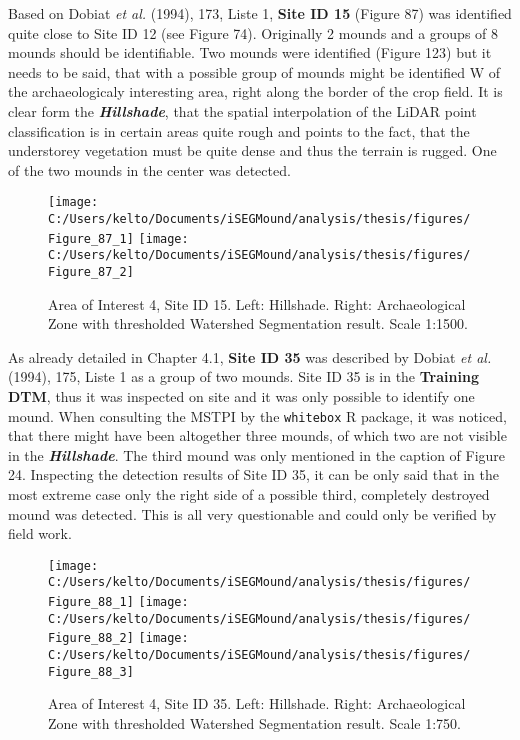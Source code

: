 \documentclass[
  12pt,
]{article}
\begin{document}
Based on Dobiat \emph{et al.} (1994), 173, Liste 1, \textbf{Site ID 15} (Figure 87) was identified quite close to Site ID 12 (see Figure 74). Originally 2 mounds and a groups of 8 mounds should be identifiable. Two mounds were identified (Figure 123) but it needs to be said, that with a possible group of mounds might be identified W of the archaeologicaly interesting area, right along the border of the crop field. It is clear form the \textbf{\emph{Hillshade}}, that the spatial interpolation of the LiDAR point classification is in certain areas quite rough and points to the fact, that the understorey vegetation must be quite dense and thus the terrain is rugged.
One of the two mounds in the center was detected.

\begin{figure}
\texttt{[image: C:/Users/kelto/Documents/iSEGMound/analysis/thesis/figures/Figure\_87\_1]} \texttt{[image: C:/Users/kelto/Documents/iSEGMound/analysis/thesis/figures/Figure\_87\_2]} \caption{Area of Interest 4, Site ID 15. Left: Hillshade. Right: Archaeological Zone with thresholded Watershed Segmentation result. Scale 1:1500.}\label{fig:Figure87}
\end{figure}

As already detailed in Chapter 4.1, \textbf{Site ID 35} was described by Dobiat \emph{et al.} (1994), 175, Liste 1 as a group of two mounds. Site ID 35 is in the \textbf{Training DTM}, thus it was inspected on site and it was only possible to identify one mound. When consulting the MSTPI by the \texttt{whitebox} R package, it was noticed, that there might have been altogether three mounds, of which two are not visible in the \textbf{\emph{Hillshade}}. The third mound was only mentioned in the caption of Figure 24. Inspecting the detection results of Site ID 35, it can be only said that in the most extreme case only the right side of a possible third, completely destroyed mound was detected. This is all very questionable and could only be verified by field work.

\begin{figure}
\texttt{[image: C:/Users/kelto/Documents/iSEGMound/analysis/thesis/figures/Figure\_88\_1]} \texttt{[image: C:/Users/kelto/Documents/iSEGMound/analysis/thesis/figures/Figure\_88\_2]} \texttt{[image: C:/Users/kelto/Documents/iSEGMound/analysis/thesis/figures/Figure\_88\_3]} \caption{Area of Interest 4, Site ID 35. Left: Hillshade. Right: Archaeological Zone with thresholded Watershed Segmentation result. Scale 1:750.}\label{fig:Figure88}
\end{figure}
\end{document}
